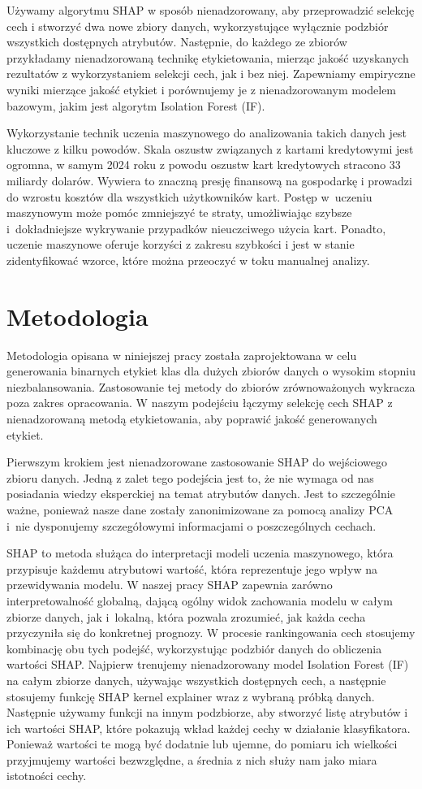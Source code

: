 \documentclass [runningheads]{llncs}
\begin{document}
Używamy algorytmu SHAP w sposób nienadzorowany, aby przeprowadzić selekcję cech i stworzyć
dwa nowe zbiory danych, wykorzystujące wyłącznie podzbiór wszystkich dostępnych atrybutów.
Następnie, do każdego ze zbiorów przykładamy nienadzorowaną technikę etykietowania, mierząc jakość
uzyskanych rezultatów z wykorzystaniem selekcji cech, jak i bez niej.
Zapewniamy empiryczne wyniki mierzące jakość etykiet i porównujemy je
z nienadzorowanym modelem bazowym, jakim jest algorytm Isolation Forest (IF).

Wykorzystanie technik uczenia maszynowego do analizowania takich danych jest kluczowe z kilku powodów.
Skala oszustw związanych z kartami kredytowymi jest ogromna, w samym 2024 roku z powodu oszustw kart kredytowych stracono 33 miliardy dolarów\cite{url-fraud-money}.
Wywiera to znaczną presję finansową na gospodarkę i prowadzi do wzrostu kosztów dla wszystkich użytkowników kart.
Postęp w~uczeniu maszynowym może pomóc zmniejszyć te straty, umożliwiając szybsze i~dokładniejsze wykrywanie przypadków nieuczciwego użycia kart.
Ponadto, uczenie maszynowe oferuje korzyści z zakresu szybkości i jest w stanie zidentyfikować wzorce, które można przeoczyć w toku manualnej analizy.

\section*{Metodologia}
Metodologia opisana w niniejszej pracy została zaprojektowana w celu generowania binarnych etykiet klas dla dużych zbiorów danych o wysokim stopniu niezbalansowania.
Zastosowanie tej metody do zbiorów zrównoważonych wykracza poza zakres opracowania.
W naszym podejściu łączymy selekcję cech SHAP z nienadzorowaną metodą etykietowania, aby poprawić jakość generowanych etykiet.

Pierwszym krokiem jest nienadzorowane zastosowanie SHAP do wejściowego zbioru danych. Jedną z zalet tego podejścia jest to, że nie wymaga od nas posiadania wiedzy eksperckiej na temat atrybutów danych.
Jest to szczególnie ważne, ponieważ nasze dane zostały zanonimizowane za pomocą analizy PCA i~nie dysponujemy szczegółowymi informacjami o poszczególnych cechach.

SHAP to metoda służąca do interpretacji modeli uczenia maszynowego, która przypisuje każdemu atrybutowi wartość, która reprezentuje jego wpływ na przewidywania modelu.
W naszej pracy SHAP zapewnia zarówno interpretowalność globalną, dającą ogólny widok zachowania modelu w całym zbiorze danych, 
jak i~lokalną, która pozwala zrozumieć, jak każda cecha przyczyniła się do konkretnej prognozy.
W procesie rankingowania cech stosujemy kombinację obu tych podejść, wykorzystując podzbiór danych do obliczenia wartości SHAP.
Najpierw trenujemy nienadzorowany model Isolation Forest (IF) na całym zbiorze danych, używając wszystkich dostępnych cech, 
a następnie stosujemy funkcję SHAP kernel explainer\cite{url-kernel-explainer} wraz z wybraną próbką danych.
Następnie używamy funkcji na innym podzbiorze, aby stworzyć listę atrybutów i ich wartości SHAP, które pokazują wkład każdej cechy w działanie klasyfikatora.
Ponieważ wartości te mogą być dodatnie lub ujemne, do pomiaru ich wielkości przyjmujemy wartości bezwzględne, a średnia z nich służy nam jako miara istotności cechy.
\end{document}
